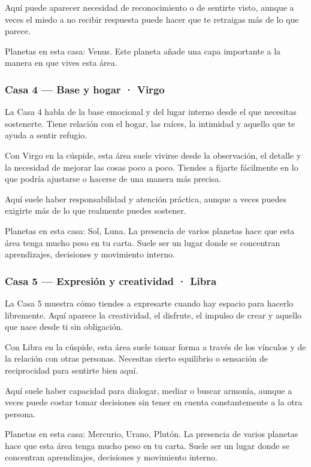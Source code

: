 \documentclass[11pt,a4paper]{article}
\begin{document}
Aquí puede aparecer necesidad de reconocimiento o de sentirte visto, aunque a veces el miedo a no recibir respuesta puede hacer que te retraigas más de lo que parece.

Planetas en esta casa: Venus. Este planeta añade una capa importante a la manera en que vives esta área.

\subsubsection*{Casa 4 — Base y hogar · Virgo}
La Casa 4 habla de la base emocional y del lugar interno desde el que necesitas sostenerte. Tiene relación con el hogar, las raíces, la intimidad y aquello que te ayuda a sentir refugio.

Con Virgo en la cúspide, esta área suele vivirse desde la observación, el detalle y la necesidad de mejorar las cosas poco a poco. Tiendes a fijarte fácilmente en lo que podría ajustarse o hacerse de una manera más precisa.

Aquí suele haber responsabilidad y atención práctica, aunque a veces puedes exigirte más de lo que realmente puedes sostener.

Planetas en esta casa: Sol, Luna. La presencia de varios planetas hace que esta área tenga mucho peso en tu carta. Suele ser un lugar donde se concentran aprendizajes, decisiones y movimiento interno.

\subsubsection*{Casa 5 — Expresión y creatividad · Libra}
La Casa 5 muestra cómo tiendes a expresarte cuando hay espacio para hacerlo libremente. Aquí aparece la creatividad, el disfrute, el impulso de crear y aquello que nace desde ti sin obligación.

Con Libra en la cúspide, esta área suele tomar forma a través de los vínculos y de la relación con otras personas. Necesitas cierto equilibrio o sensación de reciprocidad para sentirte bien aquí.

Aquí suele haber capacidad para dialogar, mediar o buscar armonía, aunque a veces puede costar tomar decisiones sin tener en cuenta constantemente a la otra persona.

Planetas en esta casa: Mercurio, Urano, Plutón. La presencia de varios planetas hace que esta área tenga mucho peso en tu carta. Suele ser un lugar donde se concentran aprendizajes, decisiones y movimiento interno.
\end{document}
